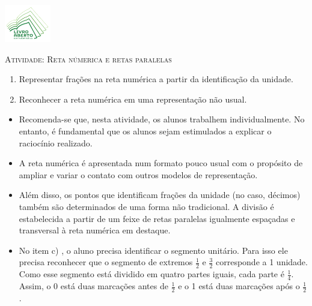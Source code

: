 \documentclass[10 pt,usenames,dvipsnames, oneside]{article}
\begin{document}
\begin{center}
  \begin{minipage}[l]{3cm}
\includegraphics[width=2cm]{../../../Figuras/logo}       
\end{minipage}\hfill
\begin{minipage}[r]{.8\textwidth}
 {\Large \scshape Atividade: Reta númerica e retas paralelas}  
\end{minipage}
\end{center}
\vspace{.2cm}

\ifdefined\prof
\begin{goals}
\begin{enumerate}
\item       Representar frações na reta numérica a partir da identificação da unidade.
    \item       Reconhecer a reta numérica em uma representação não usual.
\end{enumerate}

\tcblower

\begin{itemize}
\item       Recomenda-se que, nesta atividade, os alunos trabalhem individualmente. No entanto, é fundamental que os alunos sejam estimulados a explicar o raciocínio realizado.
\item       A reta numérica é apresentada num formato pouco usual com o propósito de ampliar e variar o contato com outros modelos de representação.
\item       Além disso, os pontos que identificam frações da unidade (no caso, décimos) também são determinados de uma forma não tradicional. A divisão é estabelecida a partir de um feixe de retas paralelas igualmente espaçadas e transversal à reta numérica em destaque.
\item       No item c) , o aluno precisa identificar o segmento unitário. Para isso ele precisa reconhecer que o segmento de extremos $\frac{1}{2}$ e $\frac{3}{2}$ corresponde a 1 unidade. Como esse segmento está dividido em quatro partes iguais, cada parte é $\frac{1}{4}$. Assim, o 0 está duas marcações antes de $\frac{1}{2}$ e o 1 está duas marcações após o $\frac{1}{2}$.
\end{itemize}
\end{goals}
\end{document}
